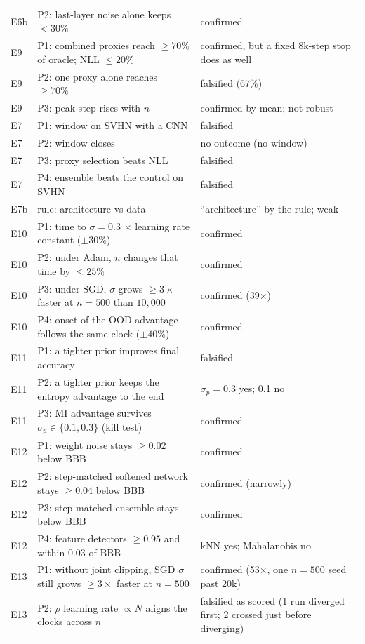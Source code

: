 \documentclass[10pt]{article}
\begin{document}
{\begin{longtable}{p{0.9cm}p{8.6cm}p{4.6cm}}
E6b & P2: last-layer noise alone keeps $<30\%$ & confirmed \\
E9 & P1: combined proxies reach $\ge70\%$ of oracle; NLL $\le20\%$ & confirmed, but a fixed 8k-step stop does as well \\
E9 & P2: one proxy alone reaches $\ge70\%$ & falsified (67\%) \\
E9 & P3: peak step rises with $n$ & confirmed by mean; not robust \\
E7 & P1: window on SVHN with a CNN & falsified \\
E7 & P2: window closes & no outcome (no window) \\
E7 & P3: proxy selection beats NLL & falsified \\
E7 & P4: ensemble beats the control on SVHN & falsified \\
E7b & rule: architecture vs data & ``architecture'' by the rule; weak \\
E10 & P1: time to $\sigma=0.3$ $\times$ learning rate constant ($\pm30\%$) & confirmed \\
E10 & P2: under Adam, $n$ changes that time by $\le25\%$ & confirmed \\
E10 & P3: under SGD, $\sigma$ grows $\ge3\times$ faster at $n=500$ than $10{,}000$ & confirmed (39$\times$) \\
E10 & P4: onset of the OOD advantage follows the same clock ($\pm40\%$) & confirmed \\
E11 & P1: a tighter prior improves final accuracy & falsified \\
E11 & P2: a tighter prior keeps the entropy advantage to the end & $\sigma_p=0.3$ yes; 0.1 no \\
E11 & P3: MI advantage survives $\sigma_p\in\{0.1, 0.3\}$ (kill test) & confirmed \\
E12 & P1: weight noise stays $\ge0.02$ below BBB & confirmed \\
E12 & P2: step-matched softened network stays $\ge0.04$ below BBB & confirmed (narrowly) \\
E12 & P3: step-matched ensemble stays below BBB & confirmed \\
E12 & P4: feature detectors $\ge0.95$ and within 0.03 of BBB & kNN yes; Mahalanobis no \\
E13 & P1: without joint clipping, SGD $\sigma$ still grows $\ge3\times$ faster at $n=500$ & confirmed (53$\times$, one $n=500$ seed past 20k) \\
E13 & P2: $\rho$ learning rate $\propto N$ aligns the clocks across $n$ & falsified as scored (1 run diverged first; 2 crossed just before diverging) \\

\end{longtable}}
\end{document}
